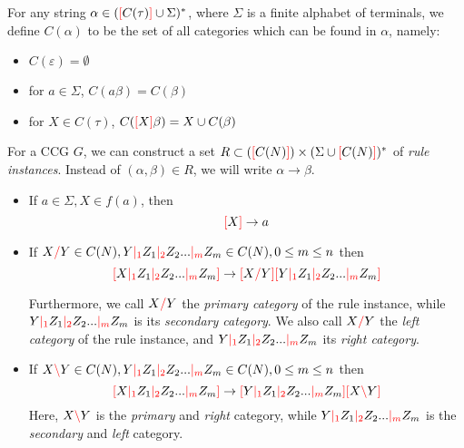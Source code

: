 \documentclass[main.tex]{subfiles}
\begin{document}
\begin{defn}
    For any string $\alpha \in (\textcolor{red}{[} C(\tau) \textcolor{red}{]} \cup \Sigma)^*$, where $\Sigma$ is a
    finite alphabet of terminals, we define $C(\alpha)$ to be the set of all
    categories which
    can be found in $\alpha$, namely:
    \begin{itemize}
        \item $C(\varepsilon) = \emptyset$
        \item for $a \in \Sigma$, $C(a\beta) = C(\beta)$
        \item for $X \in C(\tau)$, $C(\textcolor{red}{[} X \textcolor{red}{]} \beta) = X \cup C(\beta)$
    \end{itemize}
\end{defn}

\begin{defn}
    For a CCG $G$, we can construct a set $R \subset (\textcolor{red}{[} C(N) \textcolor{red}{]}) \times (\Sigma \cup \textcolor{red}{[} C(N) \textcolor{red}{]})^*$
    of \emph{rule instances}. Instead of $(\alpha, \beta) \in R$, we will write
    $\alpha \rightarrow \beta$.

    \begin{itemize}
        \item If $ a \in \Sigma, X \in f(a) $, then \[ \textcolor{red}{[} X \textcolor{red}{]} \rightarrow a \]
        \item If $ X \textcolor{red}{/} Y \in C(N), Y \textcolor{red}{|_{1}} Z_1 \textcolor{red}{|_{2}} Z_2 ... \textcolor{red}{|_{m}} Z_m \in C(N), 0 \leq m \leq n $
            then \[ \textcolor{red}{[} X \textcolor{red}{|_{1}} Z_1 \textcolor{red}{|_{2}} Z_2 ... \textcolor{red}{|_{m}} Z_m \textcolor{red}{]} \rightarrow \textcolor{red}{[} X \textcolor{red}{/} Y \textcolor{red}{]} \textcolor{red}{[} Y \textcolor{red}{|_{1}} Z_1 \textcolor{red}{|_{2}} Z_2 ... \textcolor{red}{|_{m}} Z_m \textcolor{red}{]} \]

            Furthermore, we call $ X \textcolor{red}{/} Y $ the \emph{primary category} of the rule
            instance, while $ Y \textcolor{red}{|_{1}} Z_1 \textcolor{red}{|_{2}} Z_2 ... \textcolor{red}{|_{m}} Z_m $ is its
            \emph{secondary category}.
            We also call $ X \textcolor{red}{/} Y $ the \emph{left category} of the rule instance,
            and $  Y \textcolor{red}{|_{1}} Z_1 \textcolor{red}{|_{2}} Z_2 ... \textcolor{red}{|_{m}} Z_m $ its \emph{right category}.
        \item If $ X \textcolor{red}{\backslash} Y \in C(N), Y \textcolor{red}{|_{1}} Z_1 \textcolor{red}{|_{2}} Z_2 ... \textcolor{red}{|_{m}} Z_m \in C(N), 0 \leq m \leq n $
            then \[ \textcolor{red}{[} X \textcolor{red}{|_{1}} Z_1 \textcolor{red}{|_{2}} Z_2 ... \textcolor{red}{|_{m}} Z_m \textcolor{red}{]} \rightarrow \textcolor{red}{[} Y \textcolor{red}{|_{1}} Z_1 \textcolor{red}{|_{2}} Z_2 ... \textcolor{red}{|_{m}} Z_m \textcolor{red}{]} \textcolor{red}{[} X \textcolor{red}{\backslash} Y \textcolor{red}{]} \]
            Here, $ X \textcolor{red}{\backslash} Y $ is the \emph{primary} and \emph{right} category,
            while $ Y \textcolor{red}{|_{1}} Z_1 \textcolor{red}{|_{2}} Z_2 ... \textcolor{red}{|_{m}} Z_m $ is the \emph{secondary}
            and \emph{left} category.
    \end{itemize}
\end{defn}
\end{document}
